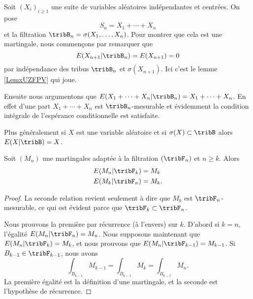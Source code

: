 \begin{example}     \label{ExtFFKTr}
    Soit \( (X_i)_{i\geq 1}\) une suite de variables aléatoires indépendantes et centrées. On pose
    \begin{equation}
        S_n=X_1+\cdots +X_n
    \end{equation}
    et la filtration \( \tribB_n=\sigma(X_1,\ldots, X_n)\). Pour montrer que cela est une martingale, nous commençons par remarquer que
    \begin{equation}
        E(X_{n+1}|\tribB_n)=E(X_{n+1})=0
    \end{equation}
    par indépendance des tribus \( \tribB_n\) et \( \sigma(X_{n+1})\). Ici c'est le lemme \ref{LemxUZFPV} qui joue.

    Ensuite nous argumentons que \( E(X_1+\cdots +X_n|\tribB_n)=X_1+\cdots +X_n\). En effet d'une part \( X_1+\cdots +X_n\) est \( \tribB_n\)-mesurable et évidemment la condition intégrale de l'espérance conditionnelle est satisfaite.

    Plus généralement si \( X\) est une variable aléatoire et si \( \sigma(X)\subset\tribB\) alors \( E(X|\tribB)=X\).
\end{example}

\begin{lemma}   \label{LemqanhgJ}
    Soit \( (M_n)\) une martingales adaptée à la filtration \( (\tribF_n)\) et \( n\geq k\). Alors
    \begin{subequations}
        \begin{align}
            E(M_n|\tribF_k)&=M_k\\
            E(M_k|\tribF_n)&=M_k.
        \end{align}
    \end{subequations}
\end{lemma}

\begin{proof}
    La seconde relation revient seulement à dire que \( M_k\) est \( \tribF_n\)-mesurable, ce qui est évident parce que \( \tribF_k\subset\tribF_n\).

    Nous prouvons la première par récurrence (à l'envers) sur \( k\). D'abord si \( k=n\), l'égalité \( E(M_n|\tribF_n)=M_n\). Nous supposons maintenant que \( E(M_n|\tribF_k)=M_k\), et nous prouvons que \( E(M_n|\tribF_{k-1})=M_{k-1}\). Si \( B_{k-1}\in \tribF_{k-1}\), nous avons
    \begin{equation}
        \int_{B_{k-1}}M_{k-1}=\int_{B_{k-1}}M_{k}=\int_{B_{k-1}}M_n.
    \end{equation}
    La première égalité est la définition d'une martingale, et la seconde est l'hypothèse de récurrence.
\end{proof}

